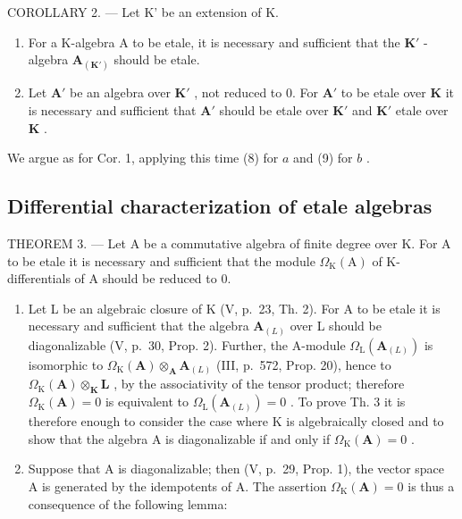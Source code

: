 COROLLARY 2. --- Let K' be an extension of K.

\begin{enumerate}
\def\labelenumi{\alph{enumi})}
\item
  For a K-algebra A to be etale, it is necessary and sufficient that the \(\mathbf{K}'\) -algebra \(\mathbf{A}_{(\mathbf{K}')}\) should be etale.
\item
  Let \(\mathbf{A}'\) be an algebra over \(\mathbf{K}'\) , not reduced to 0. For \(\mathbf{A}'\) to be etale over \(\mathbf{K}\) it is necessary and sufficient that \(\mathbf{A}'\) should be etale over \(\mathbf{K}'\) and \(\mathbf{K}'\) etale over \(\mathbf{K}\) .
\end{enumerate}

We argue as for Cor. 1, applying this time (8) for \(a\) and (9) for \(b\) .

\subsection{Differential characterization of etale algebras}

THEOREM 3. --- Let A be a commutative algebra of finite degree over K. For A to be etale it is necessary and sufficient that the module \(\Omega_{\mathrm{K}}(\mathrm{A})\) of K-differentials of A should be reduced to 0.

\begin{enumerate}
\def\labelenumi{\Alph{enumi})}
\item
  Let L be an algebraic closure of K (V, p.~23, Th. 2). For A to be etale it is necessary and sufficient that the algebra \(\mathbf{A}_{(L)}\) over L should be diagonalizable (V, p.~30, Prop. 2). Further, the A-module \(\Omega_{\mathrm{L}}(\mathbf{A}_{(L)})\) is isomorphic to \(\Omega_{\mathrm{K}}(\mathbf{A}) \otimes_{\mathbf{A}} \mathbf{A}_{(L)}\) (III, p.~572, Prop. 20), hence to \(\Omega_{\mathrm{K}}(\mathbf{A}) \otimes_{\mathbf{K}} \mathbf{L}\) , by the associativity of the tensor product; therefore \(\Omega_{\mathrm{K}}(\mathbf{A}) = 0\) is equivalent to \(\Omega_{\mathrm{L}}(\mathbf{A}_{(L)}) = 0\) . To prove Th. 3 it is therefore enough to consider the case where K is algebraically closed and to show that the algebra A is diagonalizable if and only if \(\Omega_{\mathrm{K}}(\mathbf{A}) = 0\) .
\item
  Suppose that A is diagonalizable; then (V, p.~29, Prop. 1), the vector space A is generated by the idempotents of A. The assertion \(\Omega_{\mathrm{K}}(\mathbf{A}) = 0\) is thus a consequence of the following lemma:
\end{enumerate}

